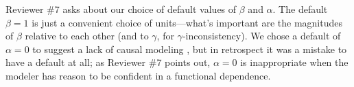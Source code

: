 \documentclass{article}
\makeatletter
\theoremstyle{plain}
\theoremstyle{definition}
\newcommand{\dg}[1]{\mathbdcal{#1}}
\newcommand\aar{\@ifstar\aar@one@star\aar@plain}
\newcommand\aar@one@star{\@ifstar\aar@resize{\aar@plain*}}
\newcommand\aar@resize[1]{\sbox{\aar@content}{#1}\scaleleftright[3.8ex]
			{\Biggl\langle\!\!\!\!\Biggl\langle}{\usebox{\aar@content}}
			{\Biggr\rangle\!\!\!\!\Biggr\rangle}}
\newcommand\revc[1]{{\color{revcolor}#1}}
\makeatother
\begin{document}
%


\revc{Reviewer \#7} asks about our choice of default values of $\beta$ and $\alpha$.
The default $\beta\!=\! 1$ is just a convenient choice of units---what’s important are the magnitudes of $\beta$ relative to each other (and to $\gamma$, for $\gamma$-inconsistency).
%
We chose a default of $\alpha\!=\! 0$ to suggest a lack of causal modeling%
, but in retrospect it was a mistake to have a default at all; %
as \revc{Reviewer \#7} points out, $\alpha\!=\! 0$ is inappropriate when the modeler has reason to be confident in a functional dependence.
%
\end{document}

